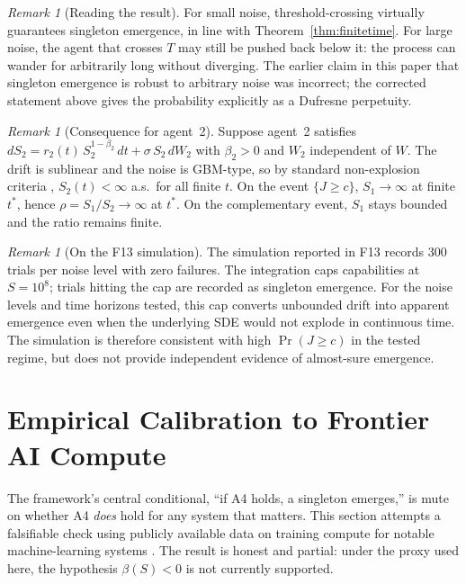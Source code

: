 \documentclass[11pt,letterpaper]{article}
\theoremstyle{plain}
\theoremstyle{definition}
\theoremstyle{remark}
\newtheorem{remark}[theorem]{Remark}
\newcommand{\tstar}{t^{*}}
\begin{document}
\begin{remark}[Reading the result]
For small noise, threshold-crossing virtually guarantees singleton
emergence, in line with Theorem~\ref{thm:finitetime}.
For large noise, the agent that crosses $T$ may still be pushed back
below it: the process can wander for arbitrarily long without diverging.
The earlier claim in this paper that singleton emergence is robust to
arbitrary noise was incorrect; the corrected statement above gives the
probability explicitly as a Dufresne perpetuity.
\end{remark}

\begin{remark}[Consequence for agent~2]
Suppose agent~2 satisfies $dS_2 = r_2(t)\,S_2^{1-\beta_2}\,dt + \sigma\,S_2\,dW_2$
with $\beta_2 > 0$ and $W_2$ independent of $W$.
The drift is sublinear and the noise is GBM-type, so by standard
non-explosion criteria \citep[Prop.~5.5.32]{karatzas1991brownian},
$S_2(t) < \infty$ a.s.\ for all finite $t$.
On the event $\{J \geq c\}$, $S_1 \to \infty$ at finite $\tstar$, hence
$\rho = S_1/S_2 \to \infty$ at $\tstar$.
On the complementary event, $S_1$ stays bounded and the ratio remains
finite.
\end{remark}

\begin{remark}[On the F13 simulation]
The simulation reported in F13 records $300$ trials per noise level with
zero failures.
The integration caps capabilities at $S = 10^{8}$; trials hitting the
cap are recorded as singleton emergence.
For the noise levels and time horizons tested, this cap converts
unbounded drift into apparent emergence even when the underlying SDE
would not explode in continuous time.
The simulation is therefore consistent with high $\Pr(J \geq c)$ in the
tested regime, but does not provide independent evidence of almost-sure
emergence.
\end{remark}

\section{Empirical Calibration to Frontier AI Compute}
\label{sec:calibration}

The framework's central conditional, ``if A4 holds, a singleton
emerges,'' is mute on whether A4 \emph{does} hold for any system that
matters.
This section attempts a falsifiable check using publicly available data
on training compute for notable machine-learning systems
\citep{epoch2024compute}.
The result is honest and partial: under the proxy used here, the
hypothesis $\beta(S) < 0$ is not currently supported.
\end{document}
